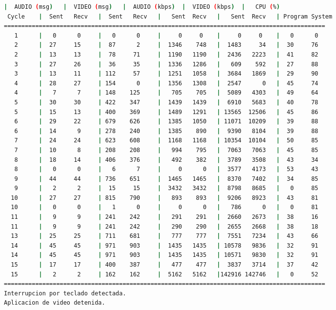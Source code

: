 \begin{adjustbox}{max width=\textwidth}
\begin{lstlisting}[language=bash,basicstyle=\ttfamily\scriptsize]
          |  AUDIO (msg)   |  VIDEO (msg)   |  AUDIO (kbps)  |  VIDEO (kbps)  |   CPU (%)
 Cycle    |  Sent   Recv   |  Sent   Recv   |   Sent  Recv   |   Sent  Recv   | Program System
============================================================================================
   1      |   0      0     |   0      0     |     0     0    |     0     0    |   0      0
   2      |  27     15     |  87      2     |  1346    748   |  1483     34   |  30     76
   2      |  13     13     |  78     71     |  1190   1190   |  2436   2223   |  41     82
   3      |  27     26     |  36     35     |  1336   1286   |   609    592   |  27     88
   3      |  13     11     | 112     57     |  1251   1058   |  3684   1869   |  29     90
   4      |  28     27     | 154      0     |  1356   1308   |  2547      0   |  45     74
   4      |   7      7     | 148    125     |   705    705   |  5089   4303   |  49     64
   5      |  30     30     | 422    347     |  1439   1439   |  6910   5683   |  40     78
   5      |  15     13     | 400    369     |  1489   1291   | 13565  12506   |  45     86
   6      |  29     22     | 679    626     |  1385   1050   | 11071  10209   |  39     88
   6      |  14      9     | 278    240     |  1385    890   |  9390   8104   |  39     88
   7      |  24     24     | 623    608     |  1168   1168   | 10354  10104   |  50     85
   7      |  10      8     | 208    208     |   994    795   |  7063   7063   |  45     85
   8      |  18     14     | 406    376     |   492    382   |  3789   3508   |  43     34
   8      |   0      0     |   6      7     |     0      0   |  3577   4173   |  53     43
   9      |  44     44     | 736    651     |  1465   1465   |  8370   7402   |  34     85
   9      |   2      2     |  15     15     |  3432   3432   |  8798   8685   |   0     85
  10      |  27     27     | 815    790     |   893    893   |  9206   8923   |  43     81
  10      |   0      0     |   1      0     |     0      0   |   786      0   |   0     81
  11      |   9      9     | 241    242     |   291    291   |  2660   2673   |  38     16
  11      |   9      9     | 241    242     |   290    290   |  2655   2668   |  38     18
  13      |  25     25     | 711    681     |   777    777   |  7551   7234   |  43     66
  14      |  45     45     | 971    903     |  1435   1435   | 10578   9836   |  32     91
  14      |  45     45     | 971    903     |  1435   1435   | 10571   9830   |  32     91
  15      |  17     17     | 400    387     |   477    477   |  3837   3714   |  37     42
  15      |   2      2     | 162    162     |  5162   5162   |142916 142746   |   0     52
============================================================================================
Interrupcion por teclado detectada.
Aplicacion de video detenida.


\end{lstlisting}
\end{adjustbox}
